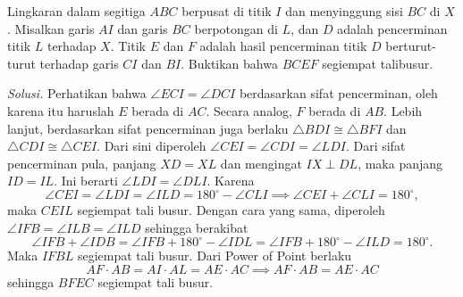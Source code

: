 \documentclass[a4paper, 11pt]{article}
\newcommand{\siku}[4][.21cm]
	{
	\coordinate (tempa) at ($(#3)!#1!(#2)$);
	\coordinate (tempb) at ($(#3)!#1!(#4)$);
	\coordinate (tempc) at ($(tempa)!0.5!(tempb)$);%
	\draw[black] (tempa) -- ($(#3)!2!(tempc)$) -- (tempb);
	}
\begin{document}
\newpage
\begin{tcolorbox}[title=\textbf{Soal 2: OSN SL 2014/G1}]
Lingkaran dalam segitiga $ABC$ berpusat di titik $I$ dan menyinggung sisi $BC$ di $X$. Misalkan garis $AI$ dan garis $BC$ berpotongan di $L$, dan $D$ adalah pencerminan titik $L$ terhadap $X$. Titik $E$ dan $F$ adalah hasil pencerminan titik $D$ berturut-turut terhadap garis $CI$ dan $BI$. Buktikan bahwa $BCEF$ segiempat talibusur. 
\end{tcolorbox}
\noindent\textit{Solusi.} Perhatikan bahwa $\angle ECI=\angle DCI$ berdasarkan sifat pencerminan, oleh karena itu haruslah $E$ berada di $AC$. Secara analog, $F$ berada di $AB$. Lebih lanjut, berdasarkan sifat pencerminan juga berlaku $\triangle BDI\cong \triangle BFI$ dan $\triangle CDI\cong \triangle CEI$. Dari sini diperoleh $\angle CEI=\angle CDI=\angle LDI$. Dari sifat pencerminan pula, panjang $XD=XL$ dan mengingat $IX\;\bot\;DL$, maka panjang $ID=IL$. Ini berarti $\angle LDI=\angle DLI$. Karena
\[\angle CEI = \angle LDI = \angle ILD = 180^\circ-\angle CLI\implies \angle CEI+\angle CLI = 180^\circ,\]
maka $CEIL$ segiempat tali busur. Dengan cara yang sama, diperoleh $\angle IFB = \angle ILB = \angle ILD$ sehingga berakibat
\[\angle IFB + \angle IDB = \angle IFB + 180^\circ - \angle IDL =\angle IFB + 180^\circ - \angle ILD =180^\circ.\]
Maka $IFBL$ segiempat tali busur. Dari Power of Point berlaku
\[AF\cdot AB = AI\cdot AL = AE\cdot AC\implies AF\cdot AB = AE\cdot AC\]
sehingga $BFEC$ segiempat tali busur.
\begin{center}
\end{center}
\end{document}
